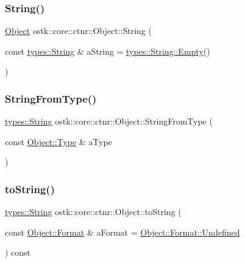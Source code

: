 \subsubsection{\texorpdfstring{String()}{String()}}
{\footnotesize\ttfamily \hyperlink{classostk_1_1core_1_1ctnr_1_1_object}{Object} ostk\+::core\+::ctnr\+::\+Object\+::\+String (\begin{DoxyParamCaption}\item[{const \hyperlink{classostk_1_1core_1_1types_1_1_string}{types\+::\+String} \&}]{a\+String = {\ttfamily \hyperlink{classostk_1_1core_1_1types_1_1_string_a66ebb081c6ece7e0140e355d0c6eaa23}{types\+::\+String\+::\+Empty}()} }\end{DoxyParamCaption})\hspace{0.3cm}{\ttfamily [static]}}

\mbox{\label{classostk_1_1core_1_1ctnr_1_1_object_a44338a6275cdfa67d6d1dcd193427d91}} 
\subsubsection{\texorpdfstring{String\+From\+Type()}{StringFromType()}}
{\footnotesize\ttfamily \hyperlink{classostk_1_1core_1_1types_1_1_string}{types\+::\+String} ostk\+::core\+::ctnr\+::\+Object\+::\+String\+From\+Type (\begin{DoxyParamCaption}\item[{const \hyperlink{classostk_1_1core_1_1ctnr_1_1_object_a49b70d4dce2d24126cd1df9aaf04d1ea}{Object\+::\+Type} \&}]{a\+Type }\end{DoxyParamCaption})\hspace{0.3cm}{\ttfamily [static]}}

\mbox{\label{classostk_1_1core_1_1ctnr_1_1_object_ace157ede511bb40843634910022dda82}} 
\subsubsection{\texorpdfstring{to\+String()}{toString()}}
{\footnotesize\ttfamily \hyperlink{classostk_1_1core_1_1types_1_1_string}{types\+::\+String} ostk\+::core\+::ctnr\+::\+Object\+::to\+String (\begin{DoxyParamCaption}\item[{const \hyperlink{classostk_1_1core_1_1ctnr_1_1_object_a3266b14cf7e3df39858f6572120e3b24}{Object\+::\+Format} \&}]{a\+Format = {\ttfamily \hyperlink{classostk_1_1core_1_1ctnr_1_1_object_a3266b14cf7e3df39858f6572120e3b24aec0fc0100c4fc1ce4eea230c3dc10360}{Object\+::\+Format\+::\+Undefined}} }\end{DoxyParamCaption}) const}

